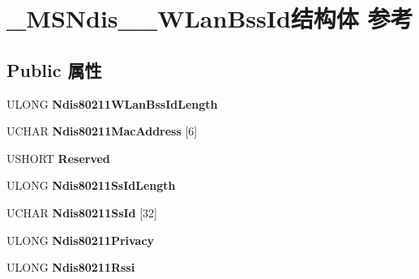 \hypertarget{struct___m_s_ndis__80211___w_lan_bss_id}{}\section{\+\_\+\+M\+S\+Ndis\+\_\+\_\+\+W\+Lan\+Bss\+Id结构体 参考}
\label{struct___m_s_ndis__80211___w_lan_bss_id}
\subsection*{Public 属性}
\begin{DoxyCompactItemize}
\item 
\mbox{\label{struct___m_s_ndis__80211___w_lan_bss_id_a1010acc0bb2dd5bfaaf7079360ca8dd8}} 
U\+L\+O\+NG {\bfseries Ndis80211\+W\+Lan\+Bss\+Id\+Length}
\item 
\mbox{\label{struct___m_s_ndis__80211___w_lan_bss_id_a9896c9dd60d3e5c50d767be9240e2d14}} 
U\+C\+H\+AR {\bfseries Ndis80211\+Mac\+Address} \mbox{[}6\mbox{]}
\item 
\mbox{\label{struct___m_s_ndis__80211___w_lan_bss_id_a41ce0b4272ce13fc065f4745771e5814}} 
U\+S\+H\+O\+RT {\bfseries Reserved}
\item 
\mbox{\label{struct___m_s_ndis__80211___w_lan_bss_id_aeb0bac068739a8a139a5acd5dfc933f4}} 
U\+L\+O\+NG {\bfseries Ndis80211\+Ss\+Id\+Length}
\item 
\mbox{\label{struct___m_s_ndis__80211___w_lan_bss_id_ac5d24b195d54fe21b3960a049890327b}} 
U\+C\+H\+AR {\bfseries Ndis80211\+Ss\+Id} \mbox{[}32\mbox{]}
\item 
\mbox{\label{struct___m_s_ndis__80211___w_lan_bss_id_ac8ef032ae4acb1a91f74bd3664e5ab14}} 
U\+L\+O\+NG {\bfseries Ndis80211\+Privacy}
\item 
\mbox{\label{struct___m_s_ndis__80211___w_lan_bss_id_ad8fa974143cda67c1f415515d930abef}} 
U\+L\+O\+NG {\bfseries Ndis80211\+Rssi}

\end{DoxyCompactItemize}
